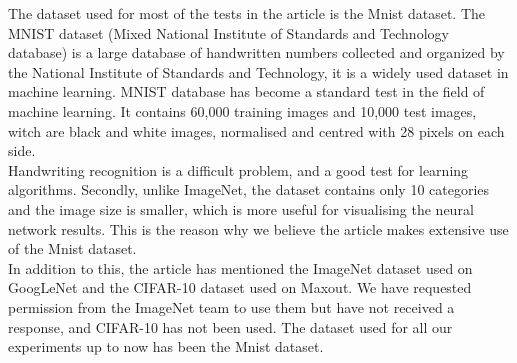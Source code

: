 
The dataset used for most of the tests in the article is the Mnist dataset. The MNIST dataset (Mixed National Institute of Standards and Technology database) is a large database of handwritten numbers collected and organized by the National Institute of Standards and Technology, it is a widely used dataset in machine learning. MNIST database has become a standard test in the field of machine learning. It contains 60,000 training images and 10,000 test images, witch are black and white images, normalised and centred with 28 pixels on each side.\\

Handwriting recognition is a difficult problem, and a good test for learning algorithms. Secondly, unlike ImageNet, the dataset contains only 10 categories and the image size is smaller, which is more useful for visualising the neural network results. This is the reason why we believe the article makes extensive use of the Mnist dataset.\\

In addition to this, the article has mentioned the ImageNet dataset used on GoogLeNet and the CIFAR-10 dataset used on Maxout. We have requested permission from the ImageNet team to use them but have not received a response, and CIFAR-10 has not been used. The dataset used for all our experiments up to now has been the Mnist dataset.